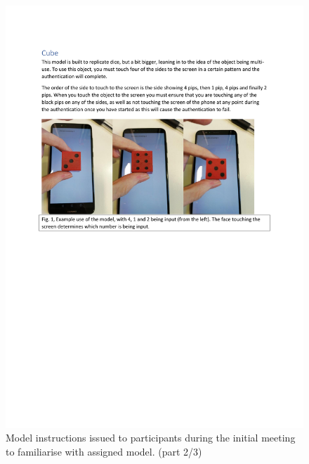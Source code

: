 \documentclass{l4proj}
\begin{document}
\begin{appendices}
\begin{figure}
    \centering
    \includegraphics[page=2,width=\linewidth]{Appendices/Model Instructions.pdf}
    \caption{Model instructions issued to participants during the initial meeting to familiarise with assigned model. (part 2/3)}
    \label{fig:interaction2}
\end{figure}


\end{appendices}
\end{document}
